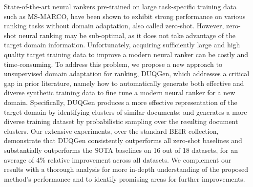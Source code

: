 State-of-the-art neural rankers pre-trained on large task-specific training data such as MS-MARCO, have been shown to exhibit strong performance on various ranking tasks without domain adaptation, also called zero-shot. However, zero-shot neural ranking may be sub-optimal, as it does not take advantage of the target domain information. Unfortunately, acquiring sufficiently large and high quality target training data to improve a modern neural ranker can be costly and time-consuming. To address this problem, we propose a new approach to unsupervised domain adaptation for ranking, DUQGen, which addresses a critical gap in prior literature, namely how to automatically generate both effective and diverse synthetic training data to fine tune a modern neural ranker for a new domain. Specifically, DUQGen produces a more effective representation of the target domain by identifying clusters of similar documents; and generates a more diverse training dataset by probabilistic sampling over the resulting document clusters. Our extensive experiments, over the standard BEIR collection, demonstrate that DUQGen consistently outperforms all zero-shot baselines and substantially outperforms the SOTA baselines on 16 out of 18 datasets, for an average of 4\% relative improvement across all datasets. We complement our results with a thorough analysis for more in-depth understanding of the proposed method's performance and to identify promising areas for further improvements.